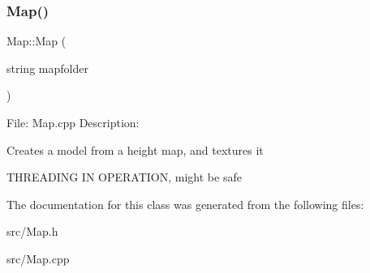 \subsubsection{\texorpdfstring{Map()}{Map()}}
{\footnotesize\ttfamily Map\+::\+Map (\begin{DoxyParamCaption}\item[{string}]{mapfolder }\end{DoxyParamCaption})}

File\+: Map.\+cpp Description\+:

Creates a model from a height map, and textures it

T\+H\+R\+E\+A\+D\+I\+NG IN O\+P\+E\+R\+A\+T\+I\+ON, might be safe 

The documentation for this class was generated from the following files\+:\begin{DoxyCompactItemize}
\item 
src/Map.\+h\item 
src/Map.\+cpp\end{DoxyCompactItemize}

